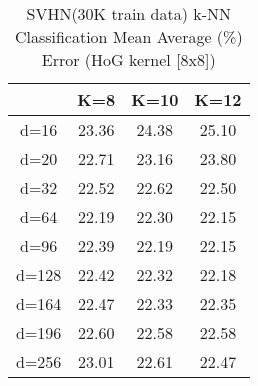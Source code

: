 \begin{table}[H]
\centering
\label{tab:table13}
\begin{tabular}{|c|c|c|c|}
\hline
 & K=8 & K=10 & K=12 \\
\hline
d=16 & 23.36 & 24.38 & 25.10 \\
d=20 & 22.71 & 23.16 & 23.80 \\
d=32 & 22.52 & 22.62 & 22.50 \\
d=64 & 22.19 & 22.30 & 22.15 \\
d=96 & 22.39 & 22.19 & 22.15 \\
d=128 & 22.42 & 22.32 & 22.18 \\
d=164 & 22.47 & 22.33 & 22.35 \\
d=196 & 22.60 & 22.58 & 22.58 \\
d=256 & 23.01 & 22.61 & 22.47 \\
\hline
\end{tabular}
\caption{SVHN(30K train data) k-NN Classification Mean Average (\%) Error (HoG kernel [8x8])}
\end{table}

